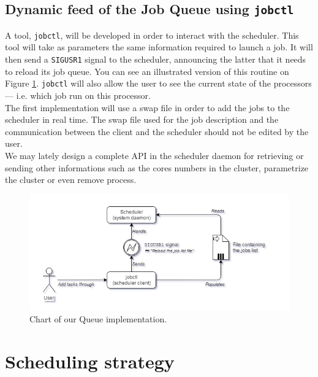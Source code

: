 \documentclass[a4paper,11pt]{article}
\begin{document}
\subsection{Dynamic feed of the Job Queue using \texttt{jobctl}}\label{jobctl_implementation}

A tool, \texttt{jobctl}, will be developed in order to interact with the scheduler. This tool will take as parameters the same information required to launch a job. It will then send a \texttt{SIGUSR1} signal to the scheduler, announcing the latter that it needs to reload its job queue. You can see an illustrated version of this routine on Figure \ref{jobctl_implementation_png}. \texttt{jobctl} will also allow the user to see the current state of the processors --- i.e. which job run on this processor.\\
The first implementation will use a swap file in order to add the jobs to the scheduler in real time. The swap file used for the job description and the communication between the client and the scheduler should not be edited by the user.\\
We may lately design a complete API in the scheduler daemon for retrieving or sending other informations such as the cores numbers in the cluster, parametrize the cluster or even remove process.

\begin{center}
\begin{figure}[h]
\includegraphics[width=1\linewidth]{images/use_case.png}
\caption{Chart of our Queue implementation.}
\label{jobctl_implementation_png}
\end{figure}
\end{center}


\section{Scheduling strategy}\label{scheduling_strategy}
\end{document}
